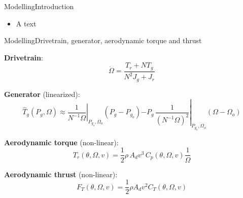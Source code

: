 \begin{frame}{Modelling}{Introduction}
	\begin{itemize}
		\item A text
	\end{itemize}
\end{frame}


\begin{frame}{Modelling}{Drivetrain, generator, aerodynamic torque and thrust}
	
	\textbf{Drivetrain}:
	\begin{equation}\label{drivetrain}
		\dot{\Omega} = \dfrac{T_{r} + N T_{g}}{N^2 J_{g} + J_{r}}
	\end{equation}
	
	\textbf{Generator} (linearized):
	\begin{equation}
		\hat T_g(P_g, \Omega) \approx \left. \dfrac{1}{N^{-1} \Omega} \right |_{P_{g_o},\Omega_o} (P_g - P_{g_o})
		\left. - P_g \, \dfrac{1}{\left( N^{-1} \Omega \right)^2} \right |_{P_{g_o},\Omega_o} (\Omega - \Omega_o)
	\end{equation}

	\textbf{Aerodynamic torque} (non-linear):
	\begin{equation}\label{eq:comp_Mrot_wind}
		T_r(\theta, \Omega, v) = \dfrac{1}{2} \rho \, A_d v^3 \, C_p(\theta, \Omega, v) \dfrac{1}{\Omega}
	\end{equation}

	\textbf{Aerodynamic thrust} (non-linear):
	\begin{equation} \label{eq:comp_aero_thrust}
		F_T(\theta, \Omega, v) = \dfrac{1}{2} \rho A_d v^2 C_T(\theta, \Omega, v)
	\end{equation}
\end{frame}



